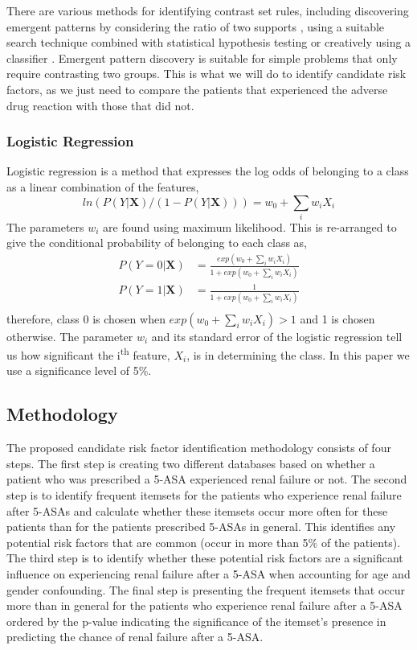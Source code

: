 \documentclass{llncs}
\begin{document}
There are various methods for identifying contrast set rules, including discovering emergent patterns by considering the ratio of two supports \cite{dong1999efficient}, using a suitable search technique combined with statistical hypothesis testing \cite{bay2001detecting} or creatively using a classifier \cite{novak2009supervised}. Emergent pattern discovery is suitable for simple problems that only require contrasting two groups. This is what we will do to identify candidate risk factors, as we just need to compare the patients that experienced the adverse drug reaction with those that did not.

\subsubsection{Logistic Regression}
Logistic regression \cite{hosmer2004applied} is a method that expresses the log odds of belonging to a class as a linear combination of the features,
\begin{equation}
ln(P(Y|\mathbf{X})/(1-P(Y|\mathbf{X}))) = w_{0} + \sum_{i} w_{i}X_{i} 
\end{equation}
The parameters $w_{i}$ are found using maximum likelihood. This is re-arranged to give the conditional probability of belonging to each class as,
\begin{equation}
\begin{split}
P(Y=0|\mathbf{X}) &= \frac{exp(w_{0} + \sum_{i} w_{i}X_{i} )}{1+exp(w_{0} + \sum_{i} w_{i}X_{i} )} \\
P(Y=1|\mathbf{X}) &= \frac{1}{1+exp(w_{0} + \sum_{i} w_{i}X_{i} )} \\
\end{split}
\end{equation}
therefore, class $0$ is chosen when $exp(w_{0} + \sum_{i} w_{i}X_{i} ) >1$ and 1 is chosen otherwise. The parameter $w_{i}$ and its standard error of the logistic regression tell us how significant the i\textsuperscript{th} feature, $X_{i}$, is in determining the class. In this paper we use a significance level of 5\%.

\subsection{Methodology}
The proposed candidate risk factor identification methodology consists of four steps. The first step is creating two different databases based on whether a patient who was prescribed a 5-ASA experienced renal failure or not. The second step is to identify frequent itemsets for the patients who experience renal failure after 5-ASAs and calculate whether these itemsets occur more often for these patients than for the patients prescribed 5-ASAs in general. This identifies any potential risk factors that are common (occur in more than 5\% of the patients). The third step is to identify whether these potential risk factors are a significant influence on experiencing renal failure after a 5-ASA when accounting for age and gender confounding. The final step is presenting the frequent itemsets that occur more than in general for the patients who experience renal failure after a 5-ASA ordered by the p-value indicating the significance of the itemset's presence in predicting the chance of renal failure after a 5-ASA.
\end{document}
